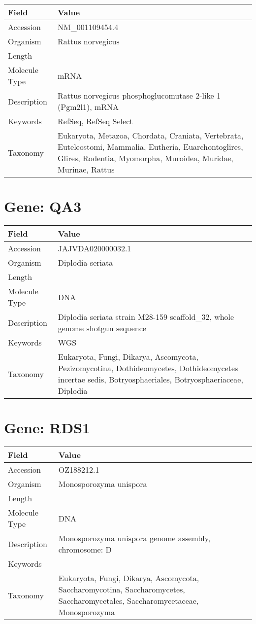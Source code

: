 \documentclass[10pt]{article}
\begin{document}
{\footnotesize
\begin{longtable}{>{\raggedright\arraybackslash}p{4.5cm} >{\raggedright\arraybackslash}p{11.5cm}}
\textbf{Field} & \textbf{Value} \\
\hline
Accession & NM\_001109454.4 \\
Organism & Rattus norvegicus \\
Length & 8471 \\
Molecule Type & mRNA \\
Description & Rattus norvegicus phosphoglucomutase 2-like 1 (Pgm2l1), mRNA \\
Keywords & RefSeq, RefSeq Select \\
Taxonomy & Eukaryota, Metazoa, Chordata, Craniata, Vertebrata, Euteleostomi, Mammalia, Eutheria, Euarchontoglires, Glires, Rodentia, Myomorpha, Muroidea, Muridae, Murinae, Rattus \\
\end{longtable}
}


\section*{Gene: QA3}
{\footnotesize
\begin{longtable}{>{\raggedright\arraybackslash}p{4.5cm} >{\raggedright\arraybackslash}p{11.5cm}}
\textbf{Field} & \textbf{Value} \\
\hline
Accession & JAJVDA020000032.1 \\
Organism & Diplodia seriata \\
Length & 390300 \\
Molecule Type & DNA \\
Description & Diplodia seriata strain M28-159 scaffold\_32, whole genome shotgun sequence \\
Keywords & WGS \\
Taxonomy & Eukaryota, Fungi, Dikarya, Ascomycota, Pezizomycotina, Dothideomycetes, Dothideomycetes incertae sedis, Botryosphaeriales, Botryosphaeriaceae, Diplodia \\
\end{longtable}
}


\section*{Gene: RDS1}
{\footnotesize
\begin{longtable}{>{\raggedright\arraybackslash}p{4.5cm} >{\raggedright\arraybackslash}p{11.5cm}}
\textbf{Field} & \textbf{Value} \\
\hline
Accession & OZ188212.1 \\
Organism & Monosporozyma unispora \\
Length & 605593 \\
Molecule Type & DNA \\
Description & Monosporozyma unispora genome assembly, chromosome: D \\
Keywords &  \\
Taxonomy & Eukaryota, Fungi, Dikarya, Ascomycota, Saccharomycotina, Saccharomycetes, Saccharomycetales, Saccharomycetaceae, Monosporozyma \\
\end{longtable}
}
\end{document}
